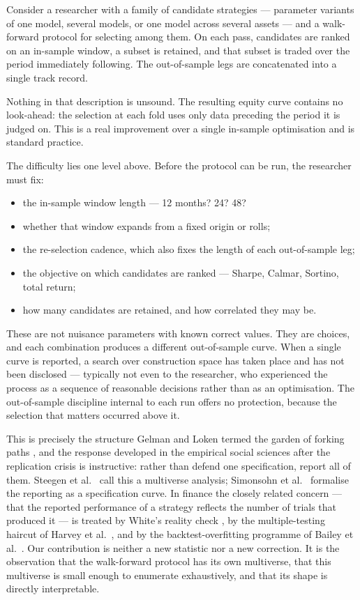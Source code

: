 \documentclass[11pt,a4paper]{article}
\begin{document}
Consider a researcher with a family of candidate strategies --- parameter
variants of one model, several models, or one model across several assets ---
and a walk-forward protocol for selecting among them. On each pass, candidates
are ranked on an in-sample window, a subset is retained, and that subset is
traded over the period immediately following. The out-of-sample legs are
concatenated into a single track record.

Nothing in that description is unsound. The resulting equity curve contains no
look-ahead: the selection at each fold uses only data preceding the period it
is judged on. This is a real improvement over a single in-sample optimisation
and is standard practice.

The difficulty lies one level above. Before the protocol can be run, the
researcher must fix:

\begin{itemize}[leftmargin=1.3em,itemsep=1pt,topsep=3pt]
  \item the in-sample window length --- 12 months? 24? 48?
  \item whether that window expands from a fixed origin or rolls;
  \item the re-selection cadence, which also fixes the length of each
        out-of-sample leg;
  \item the objective on which candidates are ranked --- Sharpe, Calmar,
        Sortino, total return;
  \item how many candidates are retained, and how correlated they may be.
\end{itemize}

These are not nuisance parameters with known correct values. They are choices,
and each combination produces a different out-of-sample curve. When a single
curve is reported, a search over construction space has taken place and has not
been disclosed --- typically not even to the researcher, who experienced the
process as a sequence of reasonable decisions rather than as an optimisation.
The out-of-sample discipline internal to each run offers no protection, because
the selection that matters occurred above it.

This is precisely the structure Gelman and Loken termed the garden of forking
paths \cite{gelman2013}, and the response developed in the empirical social
sciences after the replication crisis is instructive: rather than defend one
specification, report all of them. Steegen et al.\ \cite{steegen2016} call this
a multiverse analysis; Simonsohn et al.\ \cite{simonsohn2020} formalise the
reporting as a specification curve. In finance the closely related concern ---
that the reported performance of a strategy reflects the number of trials that
produced it --- is treated by White's reality check \cite{white2000}, by the
multiple-testing haircut of Harvey et al.\ \cite{harvey2016}, and by the
backtest-overfitting programme of Bailey et al.\
\cite{bailey2014,bailey2015}. Our contribution is neither a new statistic nor a
new correction. It is the observation that the walk-forward protocol has its own
multiverse, that this multiverse is small enough to enumerate exhaustively, and
that its shape is directly interpretable.
\end{document}
